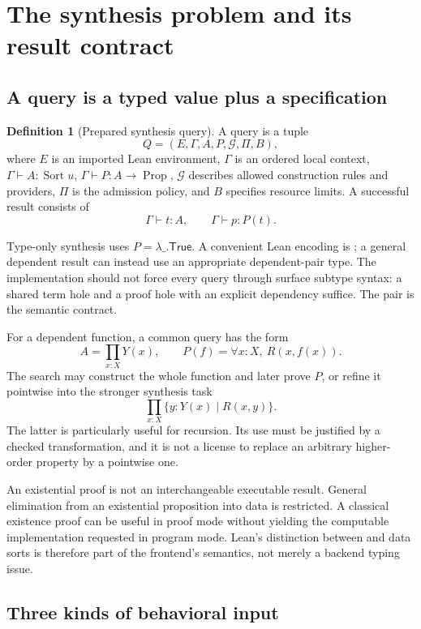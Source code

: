 \documentclass[11pt,letterpaper]{article}
\newcommand{\code}[1]{\texttt{\detokenize{#1}}}
\newcommand{\G}{\mathcal G}
\theoremstyle{definition}\newtheorem{definition}[theorem]{Definition}
\theoremstyle{remark}\newtheorem{remark}[theorem]{Remark}
\begin{document}
\section{The synthesis problem and its result contract}
\label{sec:problem}

\subsection{A query is a typed value plus a specification}

\begin{definition}[Prepared synthesis query]
A query is a tuple
\[
 Q=(E,\Gamma,A,P,\G,\Pi,B),
\]
where $E$ is an imported Lean environment, $\Gamma$ is an ordered local context,
$\Gamma\vdash A:\operatorname{Sort}u$, $\Gamma\vdash P:A\to\operatorname{Prop}$,
$\G$ describes allowed construction rules and providers, $\Pi$ is the admission
policy, and $B$ specifies resource limits. A successful result consists of
\[
 \Gamma\vdash t:A,\qquad \Gamma\vdash p:P(t).
\]
\end{definition}

Type-only synthesis uses $P=\lambda\_ .\mathsf{True}$. A convenient Lean encoding
is \code{\{x : A // P x\}}; a general dependent result can instead use an
appropriate dependent-pair type. The implementation should not force every
query through surface subtype syntax: a shared term hole and a proof hole with
an explicit dependency suffice. The pair is the semantic contract.

For a dependent function, a common query has the form
\[
 A=\prod_{x:X}Y(x),\qquad
 P(f)=\forall x:X,\ R(x,f(x)).
\]
The search may construct the whole function and later prove $P$, or refine it
pointwise into the stronger synthesis task
\[
 \prod_{x:X}\{y:Y(x)\mid R(x,y)\}.
\]
The latter is particularly useful for recursion. Its use must be justified by
a checked transformation, and it is not a license to replace an arbitrary
higher-order property by a pointwise one.

An existential proof \code{Exists fun x => P x} is not an interchangeable
executable result. General elimination from an existential proposition into
data is restricted. A classical existence proof can be useful in proof mode
without yielding the computable implementation requested in program mode.
Lean's distinction between \code{Prop} and data sorts is therefore part of the
frontend's semantics, not merely a backend typing issue.\cite{propositions}

\subsection{Three kinds of behavioral input}
\end{document}
